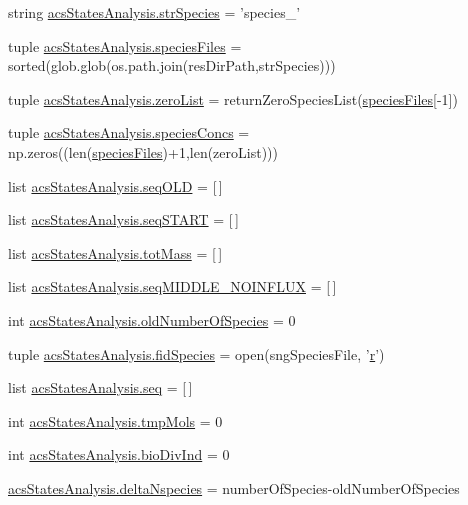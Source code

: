 \begin{DoxyCompactItemize}
string \hyperlink{a00098_ab14d209fe558e83aeede3b657a7241bb}{acs\-States\-Analysis.\-str\-Species} = 'species\-\_\-'
\item 
tuple \hyperlink{a00098_af3291bd263282353dd4a12ee38c08cae}{acs\-States\-Analysis.\-species\-Files} = sorted(glob.\-glob(os.\-path.\-join(res\-Dir\-Path,str\-Species)))
\item 
tuple \hyperlink{a00098_ac2f9e6ead14745bd749a1ab8060cd4e7}{acs\-States\-Analysis.\-zero\-List} = return\-Zero\-Species\-List(\hyperlink{a00022_af5703745c2c2a6af7f62da460994d9c2}{species\-Files}\mbox{[}-\/1\mbox{]})
\item 
tuple \hyperlink{a00098_a2377568425051a7511b51f7c50662ba1}{acs\-States\-Analysis.\-species\-Concs} = np.\-zeros((len(\hyperlink{a00022_af5703745c2c2a6af7f62da460994d9c2}{species\-Files})+1,len(zero\-List)))
\item 
list \hyperlink{a00098_a55e3b17fd716a4b1e28e7b9d93f1943c}{acs\-States\-Analysis.\-seq\-O\-L\-D} = \mbox{[}$\,$\mbox{]}
\item 
list \hyperlink{a00098_a648282264cfc8a40cf84141f9f59781f}{acs\-States\-Analysis.\-seq\-S\-T\-A\-R\-T} = \mbox{[}$\,$\mbox{]}
\item 
list \hyperlink{a00098_ac2ecae6789d89cc56b0a731065837774}{acs\-States\-Analysis.\-tot\-Mass} = \mbox{[}$\,$\mbox{]}
\item 
list \hyperlink{a00098_a8fd1a0445b2e641363a96da5a7e7159b}{acs\-States\-Analysis.\-seq\-M\-I\-D\-D\-L\-E\-\_\-\-N\-O\-I\-N\-F\-L\-U\-X} = \mbox{[}$\,$\mbox{]}
\item 
int \hyperlink{a00098_abe1ce9bb85ee916d2046efc5c3fe6b30}{acs\-States\-Analysis.\-old\-Number\-Of\-Species} = 0
\item 
tuple \hyperlink{a00098_afd34aa2ef2c410c2d71007bac0a121fd}{acs\-States\-Analysis.\-fid\-Species} = open(sng\-Species\-File, '\hyperlink{a00025_ac862e7284527eb913b1351c8bfb8e079}{r}')
\item 
list \hyperlink{a00098_a22eec19fcd0da474a136cfe97438ae3b}{acs\-States\-Analysis.\-seq} = \mbox{[}$\,$\mbox{]}
\item 
int \hyperlink{a00098_aa24f8efad70335a8460f68902001ce64}{acs\-States\-Analysis.\-tmp\-Mols} = 0
\item 
int \hyperlink{a00098_a247328d05f06695b0c2de9a001ca4548}{acs\-States\-Analysis.\-bio\-Div\-Ind} = 0
\item 
\hyperlink{a00098_a555117703c3245ec7d3d73f5d991c8c5}{acs\-States\-Analysis.\-delta\-Nspecies} = number\-Of\-Species-\/old\-Number\-Of\-Species
\item 

\end{DoxyCompactItemize}
